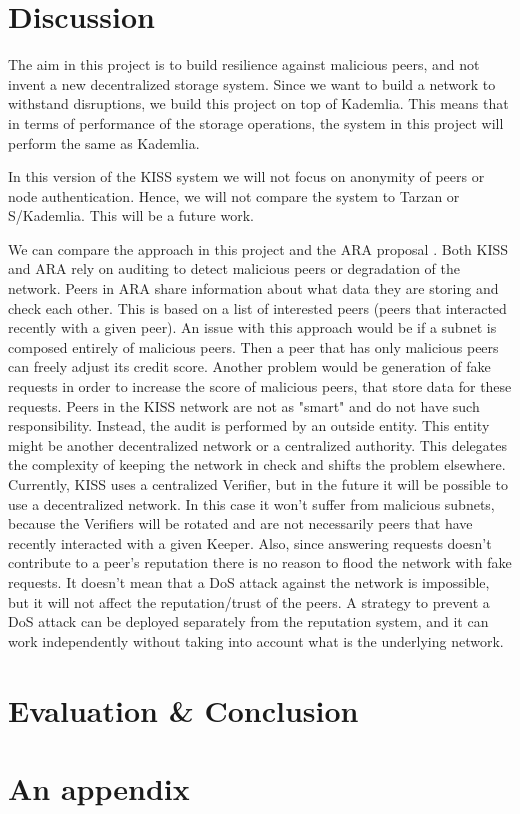 \documentclass[ twoside,openright,titlepage,numbers=noenddot,headinclude,%
                footinclude=true,cleardoublepage=empty,abstractoff, %
                BCOR=5mm,paper=a4,fontsize=11pt,%
                ngerman,american,%
                ]{scrreprt}
\begin{document}
\chapter{Discussion}
\label{cha:discussion}

The aim in this project is to build resilience against malicious peers,
and not invent a new decentralized storage system.
Since we want to build a network to withstand disruptions, we build this project on top of Kademlia.
This means that in terms of performance of the storage operations, the system in this project will perform the same
as Kademlia.

In this version of the KISS system we will not focus on anonymity of peers or node authentication.
Hence, we will not compare the system to Tarzan or S/Kademlia.
This will be a future work.

We can compare the approach in this project and the ARA proposal \cite{ara}.
Both KISS and ARA rely on auditing to detect malicious peers or degradation of the network.
Peers in ARA share information about what data they are storing and check each other.
This is based on a list of interested peers (peers that interacted recently with a given peer).
An issue with this approach would be if a subnet is composed entirely of malicious peers.
Then a peer that has only malicious peers can freely adjust its credit score.
Another problem would be generation of fake requests in order to increase the score of malicious peers,
that store data for these requests.
Peers in the KISS network are not as "smart" and do not have such responsibility.
Instead, the audit is performed by an outside entity.
This entity might be another decentralized network or a centralized authority.
This delegates the complexity of keeping the network in check and shifts the problem elsewhere.
Currently, KISS uses a centralized Verifier, but in the future it will be possible to use a decentralized network.
In this case it won't suffer from malicious subnets, because the Verifiers will be rotated and are not necessarily
peers that have recently interacted with a given Keeper.
Also, since answering requests doesn't contribute to a peer's reputation there is no reason to flood the
network with fake requests.
It doesn't mean that a DoS attack against the network is impossible,
but it will not affect the reputation/trust of the peers.
A strategy to prevent a DoS attack can be deployed separately from the reputation system,
and it can work independently without taking into account what is the underlying network.


\chapter{Evaluation \& Conclusion}
\label{cha:evaluation}

\appendix
\chapter{An appendix}
\label{cha:an-appendix}

\printbibliography
\end{document}
